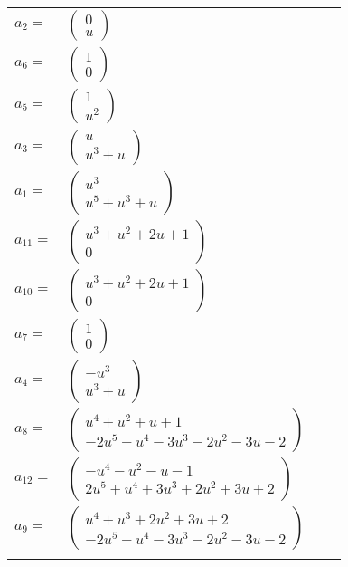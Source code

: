 \documentclass[1p]{elsarticle_modified}
\theoremstyle{definition}
\begin{document}
\begin{tabular}{m{7pt} m{180pt} m{7pt} m{180pt} }
\flushright $a_{2}=$&$\begin{pmatrix}0\\u\end{pmatrix}$ \\
\flushright $a_{6}=$&$\begin{pmatrix}1\\0\end{pmatrix}$ \\
\flushright $a_{5}=$&$\begin{pmatrix}1\\u^2\end{pmatrix}$ \\
\flushright $a_{3}=$&$\begin{pmatrix}u\\u^3+u\end{pmatrix}$ \\
\flushright $a_{1}=$&$\begin{pmatrix}u^3\\u^5+u^3+u\end{pmatrix}$ \\
\flushright $a_{11}=$&$\begin{pmatrix}u^3+u^2+2 u+1\\0\end{pmatrix}$ \\
\flushright $a_{10}=$&$\begin{pmatrix}u^3+u^2+2 u+1\\0\end{pmatrix}$ \\
\flushright $a_{7}=$&$\begin{pmatrix}1\\0\end{pmatrix}$ \\
\flushright $a_{4}=$&$\begin{pmatrix}- u^3\\u^3+u\end{pmatrix}$ \\
\flushright $a_{8}=$&$\begin{pmatrix}u^4+u^2+u+1\\-2 u^5- u^4-3 u^3-2 u^2-3 u-2\end{pmatrix}$ \\
\flushright $a_{12}=$&$\begin{pmatrix}- u^4- u^2- u-1\\2 u^5+u^4+3 u^3+2 u^2+3 u+2\end{pmatrix}$ \\
\flushright $a_{9}=$&$\begin{pmatrix}u^4+u^3+2 u^2+3 u+2\\-2 u^5- u^4-3 u^3-2 u^2-3 u-2\end{pmatrix}$\\&\end{tabular}
\end{document}
